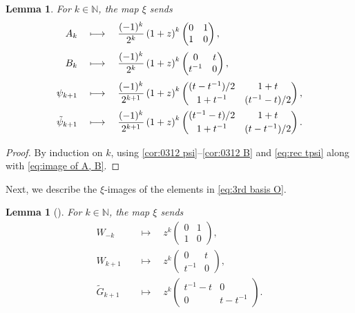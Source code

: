 \documentclass[11pt]{article}%
\theoremstyle{definition}
\theoremstyle{plain}
\newtheorem{lemma}[definition]{Lemma}
\begin{document}
\begin{lemma}\label{lem:mat_4families}
For $k \in \mathbb{N}$, the map $\xi$ sends
\begin{align}
	A_k \quad & \longmapsto \quad \frac{(-1)^k}{2^k} \left( 1+z \right)^k \begin{pmatrix} 0 & 1 \\ 1 & 0 \end{pmatrix}, \label{eq:1st,A_k image}\\[2pt]
	B_k \quad & \longmapsto \quad \frac{(-1)^k}{2^k} \left(1+z \right)^k \begin{pmatrix} 0 & t \\ t^{-1} & 0 \end{pmatrix},  \label{eq:1st,B_k image}\\[2pt]
	\psi_{k+1} \quad & \longmapsto \quad \frac{(-1)^k}{2^{k+1}} \left(1+z \right)^k 
	\begin{pmatrix} 
	(t - t^{-1})/2 & 1 + t \\[2pt] 
	1 + t^{-1} & (t^{-1} - t)/2
	\end{pmatrix}, \label{eq:psi_k image}\\
	\tilde\psi_{k+1} \quad & \longmapsto \quad \frac{(-1)^k}{2^{k+1}} \left(1+z \right)^k 
	\begin{pmatrix} 
	(t^{-1} - t)/2 & 1 + t \\[2pt] 
	1 + t^{-1} & (t - t^{-1})/2
	\end{pmatrix}. \notag
\end{align}
\end{lemma}
\begin{proof}
By induction on $k$, using \eqref{cor:0312 psi}--\eqref{cor:0312 B} and \eqref{eq:rec tpsi} along with \eqref{eq:image of A, B}.
\end{proof}

\noindent
Next, we describe the $\xi$-images of the elements in \eqref{eq:3rd basis O}.

\begin{lemma}[{\cite[Definition~3.7]{2023TerCAlg}}]
For $k \in \mathbb{N}$, the map $\xi$ sends
\begin{align}
	W_{-k} \quad & \longmapsto \quad z^k \begin{pmatrix} 0 & 1 \\ 1 & 0 \end{pmatrix}, \label{eq:mat W_(-k)}\\[2pt]
	W_{k+1} \quad & \longmapsto \quad  z^k \begin{pmatrix} 0 & t \\ t^{-1} & 0 \end{pmatrix}, \label{eq:mat W_(k)} \\[2pt]
	\tilde{G}_{k+1} \quad & \longmapsto \quad  z^k \begin{pmatrix} t^{-1} - t & 0 \\ 0 & t - t^{-1} \end{pmatrix}. \label{eq:mat G_(k+1)}
\end{align}
\end{lemma}
\end{document}
